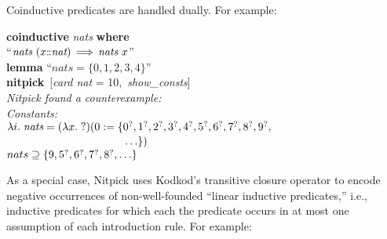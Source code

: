 \documentclass[a4paper,12pt]{article}
\def\Colon{\mathord{:\mkern-1.5mu:}}
\def\unk{{?}}
\def\undef{(\lambda x.\; \unk)}
\def\unr{\ldots}
\def\Q{{\smash{\lower.2ex\hbox{$\scriptstyle?$}}}}
\begin{document}
Coinductive predicates are handled dually. For example:

\prew
\textbf{coinductive} \textit{nats} \textbf{where} \\
``$\textit{nats}~(x\Colon\textit{nat}) \,\Longrightarrow\, \textit{nats}~x$'' \\[2\smallskipamount]
\textbf{lemma} ``$\textit{nats} = \{0, 1, 2, 3, 4\}$'' \\
\textbf{nitpick}~[\textit{card nat} = 10,\, \textit{show\_consts}] \\[2\smallskipamount]
\slshape Nitpick found a counterexample:
\\[2\smallskipamount]
\hbox{}\qquad Constants: \nopagebreak \\
\hbox{}\qquad\qquad $\lambda i.\; \textit{nats} = \undef(0 := \{\!\begin{aligned}[t]
& 0^\Q, 1^\Q, 2^\Q, 3^\Q, 4^\Q, 5^\Q, 6^\Q, 7^\Q, 8^\Q, 9^\Q, \\[-2pt]
& \unr\})\end{aligned}$ \\
\hbox{}\qquad\qquad $nats \supseteq \{9, 5^\Q, 6^\Q, 7^\Q, 8^\Q, \unr\}$
\postw

As a special case, Nitpick uses Kodkod's transitive closure operator to encode
negative occurrences of non-well-founded ``linear inductive predicates,'' i.e.,
inductive predicates for which each the predicate occurs in at most one
assumption of each introduction rule. For example:
\end{document}
